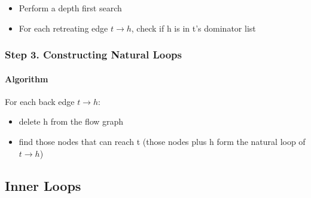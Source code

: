 \begin{itemize}
    \item Perform a depth first search
    \item For each retreating edge \(t \rightarrow h\), check if h is in t’s dominator list
\end{itemize}

\subsubsection{Step 3. Constructing Natural Loops}

\paragraph{Algorithm} For each back edge $t\rightarrow h$:

\begin{itemize}
    \item delete h from the flow graph
    \item find those nodes that can reach t
(those nodes plus h form the natural loop of \(t \rightarrow h\))
\end{itemize}



\subsection{Inner Loops}





